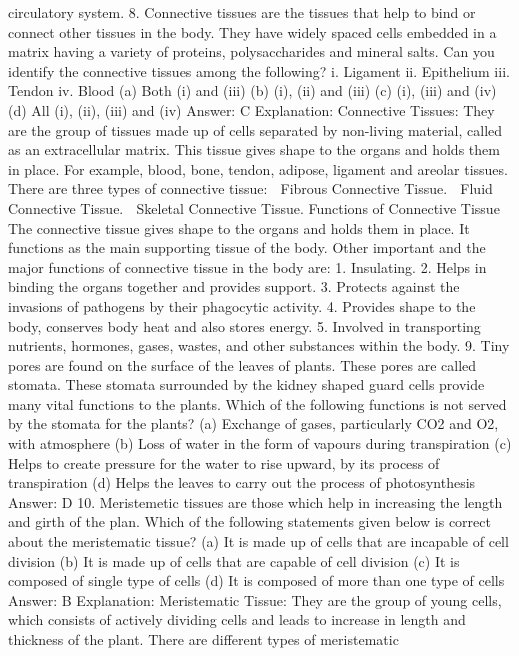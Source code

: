 circulatory system.
8. Connective tissues are the tissues that help to bind or
connect other tissues in the body. They have widely spaced cells
embedded in a matrix having a variety of proteins,
polysaccharides and mineral salts. Can you identify the
connective tissues among the following?
i. Ligament
ii. Epithelium
iii. Tendon
iv. Blood
(a) Both (i) and (iii)
(b) (i), (ii) and (iii)
(c) (i), (iii) and (iv)
(d) All (i), (ii), (iii) and (iv)
Answer: C
Explanation:
Connective Tissues: They are the group of tissues made up of cells
separated by non-living material, called as an extracellular matrix.
This tissue gives shape to the organs and holds them in place. For
example, blood, bone, tendon, adipose, ligament and areolar tissues.
There are three types of connective tissue:
 Fibrous Connective Tissue.
 Fluid Connective Tissue.
 Skeletal Connective Tissue.
Functions of Connective Tissue
The connective tissue gives shape to the organs and holds them in
place. It functions as the main supporting tissue of the body. Other
important and the major functions of connective tissue in the body
are:
1. Insulating.
2. Helps in binding the organs together and provides support.
3. Protects against the invasions of pathogens by their phagocytic
activity.
4. Provides shape to the body, conserves body heat and also
stores energy.
5. Involved in transporting nutrients, hormones, gases, wastes,
and other substances within the body.
9. Tiny pores are found on the surface of the leaves of plants.
These pores are called stomata. These stomata surrounded by
the kidney shaped guard cells provide many vital functions to the
plants.
Which of the following functions is not served by the stomata for
the plants?
(a) Exchange of gases, particularly CO2 and O2, with atmosphere
(b) Loss of water in the form of vapours during transpiration
(c) Helps to create pressure for the water to rise upward, by its
process of transpiration
(d) Helps the leaves to carry out the process of photosynthesis
Answer: D
10. Meristemetic tissues are those which help in increasing the
length and girth of the plan. Which of the following statements
given below is correct about the meristematic tissue?
(a) It is made up of cells that are incapable of cell division
(b) It is made up of cells that are capable of cell division
(c) It is composed of single type of cells
(d) It is composed of more than one type of cells
Answer: B
Explanation:
Meristematic Tissue: They are the group of young cells, which
consists of actively dividing cells and leads to increase in length and
thickness of the plant. There are different types of meristematic
